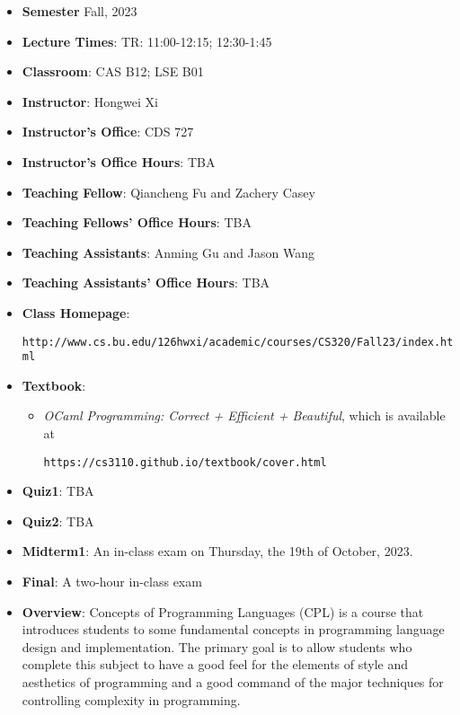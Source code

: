 \documentclass[11pt]{article}
\begin{document}
\begin{itemize}
\item {\bf Semester} Fall, 2023

\item {\bf Lecture Times}: TR: 11:00-12:15; 12:30-1:45

\item {\bf Classroom}: CAS B12; LSE B01

\item {\bf Instructor}: Hongwei Xi
\item {\bf Instructor's Office}: CDS 727
\item {\bf Instructor's Office Hours}: TBA

\item {\bf Teaching Fellow}: Qiancheng Fu and Zachery Casey 
\item {\bf Teaching Fellows' Office Hours}: TBA

\item {\bf Teaching Assistants}: Anming Gu and Jason Wang
\item {\bf Teaching Assistants' Office Hours}: TBA

\item {\bf Class Homepage}:\\
\centerline{%
\texttt{http://www.cs.bu.edu/\char126hwxi/academic/courses/CS320/Fall23/index.html}%
}%

\item {\bf Textbook}:\kern6pt
\begin{itemize}
\item
{\em OCaml Programming: Correct + Efficient + Beautiful}, which is available at
\begin{center}
\texttt{https://cs3110.github.io/textbook/cover.html}
\end{center}
\end{itemize}

\item
{\bf Quiz1}\kern6pt: TBA
\item
{\bf Quiz2}\kern6pt: TBA

\item
{\bf Midterm1}\kern6pt:
An in-class exam on Thursday, the 19th of October, 2023.

\item {\bf Final}:\kern6pt A two-hour in-class exam

\item {\bf Overview}:
Concepts of Programming Languages (CPL) is a course that introduces
students to some fundamental concepts in programming language design and
implementation. The primary goal is to allow students who complete this
subject to have a good feel for the elements of style and aesthetics of
programming and a good command of the major techniques for controlling
complexity in programming.


\end{itemize}
\end{document}
